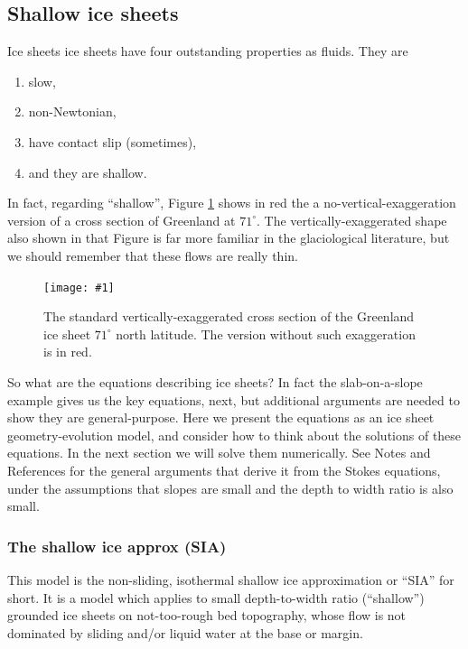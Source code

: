 \documentclass[titlepage,letterpaper,final,12pt]{scrartcl}
\newcommand{\onefig}[2]{
\begin{figure}[ht]
\centering
\texttt{[image: \#1]}
\caption{#2}
\label{fig:#1}
\end{figure}}
\begin{document}
\subsection{Shallow ice sheets}  Ice sheets ice sheets have four outstanding properties as fluids.  They are
  \begin{enumerate}
  \item slow,
  \item non-Newtonian,
  \item have contact slip (sometimes),
  \item and they are shallow.
  \end{enumerate}
In fact, regarding ``shallow'', Figure \ref{fig:green_transect} shows in red the a no-vertical-exaggeration version of a cross section of Greenland at $71^\circ$.  The vertically-exaggerated shape also shown in that Figure is far more familiar in the glaciological literature, but we should remember that these flows are really thin.

\onefig{green_transect}{The standard vertically-exaggerated cross section of the Greenland ice sheet $71^\circ$ north latitude.  The version without such exaggeration is in red.}

So what are the equations describing ice sheets?  In fact the slab-on-a-slope example gives us the key equations, next, but additional arguments are needed to show they are general-purpose.  Here we present the equations as an ice sheet geometry-evolution model, and consider how to think about the solutions of these equations.  In the next section we will solve them numerically.  See Notes and References for the general arguments that derive it from the Stokes equations, under the assumptions that slopes are small and the depth to width ratio is also small.

\subsubsection*{The shallow ice approx (SIA)}  This model is the non-sliding, isothermal shallow ice approximation or ``SIA'' for short.  It is a model which applies to small depth-to-width ratio (``shallow'') grounded ice sheets on not-too-rough bed topography, whose flow is not dominated by sliding and/or liquid water at the base or margin.
\end{document}
